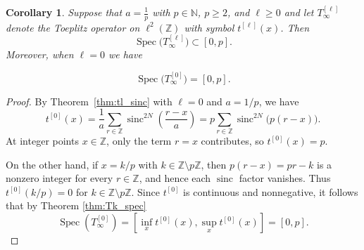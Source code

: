 \documentclass{article}
\newtheorem{corollary}{Corollary}[theorem]
\DeclareMathOperator{\sinc}{sinc}
\DeclareMathOperator{\Spec}{Spec}
\begin{document}
%


\begin{corollary} \label{corr: laurent_max_min}
    Suppose that $a = \tfrac{1}{p}$ with $p\in\mathbb{N}$,  $p\ge 2$, and $\ell\ge 0$ and let
$T_{\infty}^{[\ell]}$ denote the Toeplitz operator on $\ell^2(\mathbb{Z})$ with symbol
$t^{[\ell]}(x)$. Then
\begin{equation*}
\Spec\big(T_{\infty}^{[\ell]}\big) \subset [0,p].
\end{equation*}
Moreover, when $\ell=0$ we have 

\begin{equation*}
\Spec\big(T_{\infty}^{[0]}\big)= [0,p].
\end{equation*}

    \end{corollary}

    \begin{proof}
By Theorem~\ref{thm:tl_sinc} with $\ell=0$ and $a = 1/p$, we have
\begin{equation*}
t^{[0]}(x)
= \frac{1}{a}\sum_{r\in\mathbb{Z}} \sinc^{2N}\!\left(\frac{r-x}{a}\right)
= p \sum_{r\in\mathbb{Z}} \sinc^{2N}\big(p(r-x)\big).
\end{equation*}
At integer points $x\in\mathbb{Z}$, only the term $r=x$ contributes, so $t^{[0]}(x)=p$.

On the other hand, if $x = k/p$ with $k\in\mathbb{Z}\setminus p\mathbb{Z}$, then
$p(r-x) = pr-k$ is a nonzero integer for every $r\in\mathbb{Z}$, and hence
each $\sinc$ factor vanishes. Thus $t^{[0]}(k/p)=0$ for
$k\in\mathbb{Z}\setminus p\mathbb{Z}$.
Since $t^{[0]}$ is continuous and nonnegative, it follows that by Theorem \ref{thm:Tk_spec}
\begin{equation*}
\Spec(T_{\infty}^{[0]})=\left[\inf_x t^{[0]}(x), \sup_x t^{[0]}(x)\right] = [0,p].
\end{equation*}






\end{proof}
\end{document}
